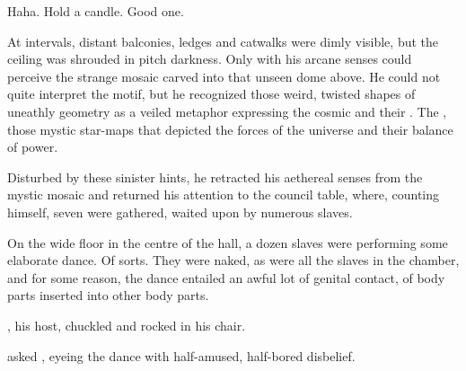 \begin{garbage}
{  Haha. 
  Hold a candle. 
  Good one.}

At intervals, distant balconies, ledges and catwalks were dimly visible, but the ceiling was shrouded in pitch darkness. 
Only with his arcane senses could \Teshrial{} perceive the strange mosaic carved into that unseen dome above. 
He could not quite interpret the motif, but he recognized those weird, twisted shapes of uneathly geometry as a veiled metaphor expressing the cosmic  and their . 
The \matrices, those mystic star-maps that depicted the forces of the universe and their balance of power. 

\index{\resphan}%
Disturbed by these sinister hints, he retracted his aethereal senses from the mystic mosaic and returned his attention to the council table, where, counting himself, seven  were gathered, waited upon by numerous  slaves. 

On the wide floor in the centre of the hall, a dozen slaves were performing some elaborate dance. Of sorts. They were naked, as were all the slaves in the chamber, and for some reason, the dance entailed an awful lot of genital contact, of body parts inserted into other body parts. 


\index{\Ganethed}%
\Ganethed{}, his host, chuckled and rocked in his chair. 

 asked \Teshrial, eyeing the dance with half-amused, half-bored disbelief. 


\end{garbage}
